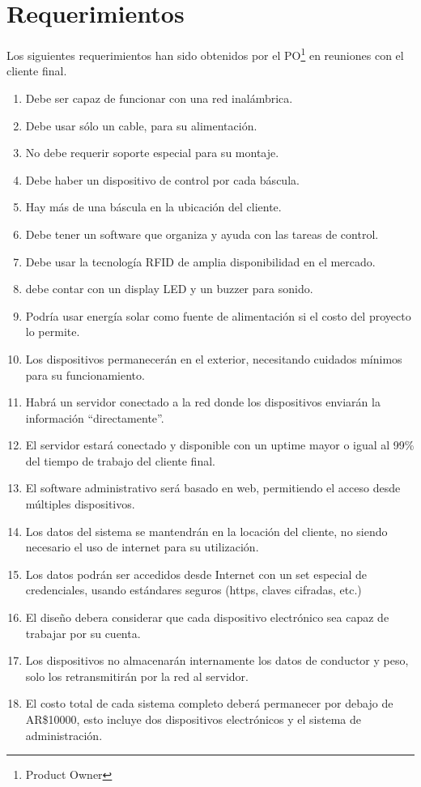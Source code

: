 \section{Requerimientos}
Los siguientes requerimientos han sido obtenidos por el PO\footnote{Product Owner} en reuniones con el cliente final.
\begin{enumerate}
	\item Debe ser capaz de funcionar con una red inal\'ambrica.
	\item Debe usar s\'olo un cable, para su alimentaci\'on.
	\item No debe requerir soporte especial para su montaje.
	\item Debe haber un dispositivo de control por cada b\'ascula.
	\item Hay m\'as de una b\'ascula en la ubicaci\'on del cliente.
	\item Debe tener un software que organiza y ayuda con las tareas de control.
	\item Debe usar la tecnolog\'ia RFID de amplia disponibilidad en el mercado.
	\item debe contar con un display LED y un buzzer para sonido.
	\item Podr\'ia usar energ\'ia solar como fuente de alimentaci\'on si el costo del proyecto lo permite.
	\item Los dispositivos permanecer\'an en el exterior, necesitando cuidados m\'inimos para su funcionamiento.
	\item Habr\'a un servidor conectado a la red donde los dispositivos enviar\'an  la informaci\'on ``directamente''.
	\item El servidor estar\'a conectado y disponible con un uptime mayor o igual al 99\% del tiempo de trabajo del cliente final.
	\item El software administrativo ser\'a basado en web, permitiendo el acceso desde m\'ultiples dispositivos.
	\item Los datos del sistema se mantendr\'an en la locaci\'on del cliente, no siendo necesario el uso de internet para su utilizaci\'on.
	\item Los datos podr\'an ser accedidos desde Internet con un set especial de credenciales, usando est\'andares seguros (https, claves cifradas, etc.)
	\item El dise\~no debera considerar que cada dispositivo electr\'onico sea capaz de trabajar por su cuenta.
	\item Los dispositivos no almacenar\'an internamente los datos de conductor y peso, solo los retransmitir\'an por la red al servidor.
	\item El costo total de cada sistema completo deber\'a permanecer por debajo de AR\$10000, esto incluye dos dispositivos electr\'onicos y el sistema de administraci\'on.
\end{enumerate}

